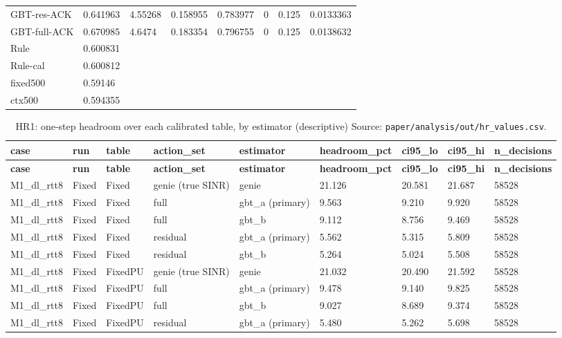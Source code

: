 \documentclass[10pt]{article}
\begin{document}
\begin{landscape}
\begin{longtable}{@{}llllllll@{}}
GBT-res-ACK & 0.641963 & 4.55268 & 0.158955 & 0.783977 & 0 & 0.125 & 0.0133363 \\
GBT-full-ACK & 0.670985 & 4.6474 & 0.183354 & 0.796755 & 0 & 0.125 & 0.0138632 \\
Rule & 0.600831 &  &  &  &  &  &  \\
Rule-cal & 0.600812 &  &  &  &  &  &  \\
fixed500 & 0.59146 &  &  &  &  &  &  \\
ctx500 & 0.594355 &  &  &  &  &  &  \\
\bottomrule
\end{longtable}
\normalsize
\tiny
\setlength{\tabcolsep}{2pt}
\begin{longtable}{@{}lllllllll@{}}
\caption{HR1: one-step headroom over each calibrated table, by estimator (descriptive) Source: \texttt{paper/analysis/out/hr\_values.csv}.}\\
\toprule
\textbf{case} & \textbf{run} & \textbf{table} & \textbf{action\_set} & \textbf{estimator} & \textbf{headroom\_pct} & \textbf{ci95\_lo} & \textbf{ci95\_hi} & \textbf{n\_decisions} \\
\midrule
\endfirsthead
\toprule
\textbf{case} & \textbf{run} & \textbf{table} & \textbf{action\_set} & \textbf{estimator} & \textbf{headroom\_pct} & \textbf{ci95\_lo} & \textbf{ci95\_hi} & \textbf{n\_decisions} \\
\midrule
\endhead
M1\_dl\_rtt8 & Fixed & Fixed & genie (true SINR) & genie & 21.126 & 20.581 & 21.687 & 58528 \\
M1\_dl\_rtt8 & Fixed & Fixed & full & gbt\_a (primary) & 9.563 & 9.210 & 9.920 & 58528 \\
M1\_dl\_rtt8 & Fixed & Fixed & full & gbt\_b & 9.112 & 8.756 & 9.469 & 58528 \\
M1\_dl\_rtt8 & Fixed & Fixed & residual & gbt\_a (primary) & 5.562 & 5.315 & 5.809 & 58528 \\
M1\_dl\_rtt8 & Fixed & Fixed & residual & gbt\_b & 5.264 & 5.024 & 5.508 & 58528 \\
M1\_dl\_rtt8 & Fixed & FixedPU & genie (true SINR) & genie & 21.032 & 20.490 & 21.592 & 58528 \\
M1\_dl\_rtt8 & Fixed & FixedPU & full & gbt\_a (primary) & 9.478 & 9.140 & 9.825 & 58528 \\
M1\_dl\_rtt8 & Fixed & FixedPU & full & gbt\_b & 9.027 & 8.689 & 9.374 & 58528 \\
M1\_dl\_rtt8 & Fixed & FixedPU & residual & gbt\_a (primary) & 5.480 & 5.262 & 5.698 & 58528 \\

\end{longtable}
\end{landscape}
\end{document}
